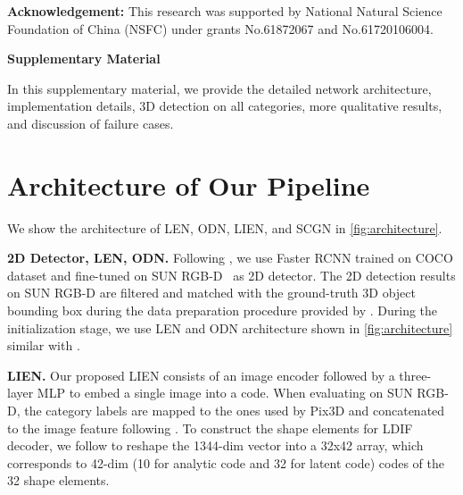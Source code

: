 \documentclass[final]{cvpr}
\let\orgautoref\autoref
\renewcommand{\autoref}[1]{\def\figureautorefname{Fig.}\orgautoref{#1}}
\begin{document}
\vspace{0.5em}
\noindent \textbf{Acknowledgement:} This research was supported by National Natural Science Foundation of China (NSFC) under grants No.61872067 and No.61720106004.








{\small


}



\clearpage

\newpage\appendix
\begin{center}
{\Large \textbf{Supplementary Material}}
\end{center}


\maketitle

In this supplementary material, we provide the detailed network architecture, implementation details, 3D detection on all categories, more qualitative results, and discussion of failure cases. 


\section{Architecture of Our Pipeline}
We show the architecture of LEN, ODN, LIEN, and SCGN in \autoref{fig:architecture}.

\noindent\textbf{2D Detector, LEN, ODN.} 
Following \cite{nie2020total3dunderstanding, huang2018cooperative}, we use Faster RCNN \cite{ren2016faster} trained on COCO dataset \cite{lin2014microsoft} and fine-tuned on SUN RGB-D~\cite{song2015sun} as 2D detector.
The 2D detection results on SUN RGB-D are filtered and matched with the ground-truth 3D object bounding box during the data preparation procedure provided by \cite{nie2020total3dunderstanding}.
During the initialization stage, we use LEN and ODN architecture shown in \autoref{fig:architecture} similar with \cite{nie2020total3dunderstanding}. 

\noindent\textbf{LIEN.} 
Our proposed LIEN consists of an image encoder followed by a three-layer MLP to embed a single image into a code. 
When evaluating on SUN RGB-D, the category labels are mapped to the ones used by Pix3D and concatenated to the image feature following \cite{nie2020total3dunderstanding}.
To construct the shape elements for LDIF decoder, we follow \cite{genova2020local} to reshape the 1344-dim vector into a 32x42 array, which corresponds to 42-dim (10 for analytic code and 32 for latent code) codes of the 32 shape elements.
\end{document}
